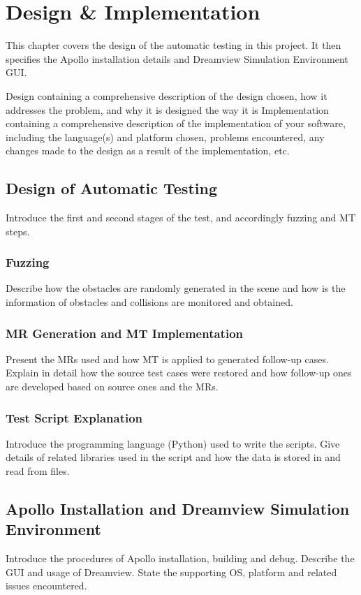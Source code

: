 \chapter{Design \& Implementation}
\label{ch:implementation}

This chapter covers the design of the automatic testing in this project. It then specifies the Apollo installation details and Dreamview Simulation Environment GUI.

Design containing a comprehensive description of the design chosen, how it addresses the problem, and why it is designed the way it is
Implementation containing a comprehensive description of the implementation of your software, including the language(s) and platform chosen, problems encountered, any changes made to the design as a result of the implementation, etc.

\section{Design of Automatic Testing}
Introduce the first and second stages of the test, and accordingly fuzzing and MT steps.

\subsection{Fuzzing}
Describe how the obstacles are randomly generated in the scene and how is the information of obstacles and collisions are monitored and obtained.

\subsection{MR Generation and MT Implementation}
Present the MRs used and how MT is applied to generated follow-up cases. Explain in detail how the source test cases were restored and how follow-up ones are developed based on source ones and the MRs.

\subsection{Test Script Explanation}
Introduce the programming language (Python) used to write the scripts. Give details of related libraries used in the script and how the data is stored in and read from files.

\section{Apollo Installation and Dreamview Simulation Environment}
Introduce the procedures of Apollo installation, building and debug. Describe the GUI and usage of Dreamview. State the supporting OS, platform and related issues encountered.

